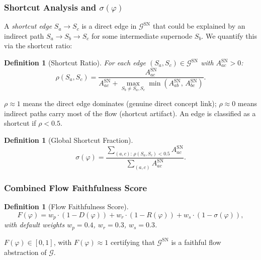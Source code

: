 \documentclass[11pt]{article}
\newtheorem{definition}[theorem]{Definition}
\newcommand{\cG}{\mathcal{G}}
\newcommand{\1}{\mathbbm{1}}
\begin{document}
\subsubsection{Shortcut Analysis and $\sigma(\varphi)$}
\label{sec:shortcuts}

A \emph{shortcut edge} $S_a \to S_c$ is a direct edge in $\cG^{\mathrm{SN}}$ that could be explained by an indirect path $S_a \to S_b \to S_c$ for some intermediate supernode $S_b$.
We quantify this via the shortcut ratio:

\begin{definition}[Shortcut Ratio]
  For each edge $(S_a, S_c) \in \cG^{\mathrm{SN}}$ with $A^{\mathrm{SN}}_{ac} > 0$:
  \begin{equation}
    \rho(S_a, S_c) = \frac{A^{\mathrm{SN}}_{ac}}{A^{\mathrm{SN}}_{ac} + \displaystyle\max_{S_b \ne S_a, S_c} \min\!\left(A^{\mathrm{SN}}_{ab},\, A^{\mathrm{SN}}_{bc}\right)}.
    \label{eq:shortcut-ratio}
  \end{equation}
\end{definition}

$\rho \approx 1$ means the direct edge dominates (genuine direct concept link); $\rho \approx 0$ means indirect paths carry most of the flow (shortcut artifact).
An edge is classified as a shortcut if $\rho < 0.5$.

\begin{definition}[Global Shortcut Fraction]
  \begin{equation}
    \sigma(\varphi) = \frac{\sum_{(a,c):\, \rho(S_a, S_c) < 0.5} A^{\mathrm{SN}}_{ac}}{\sum_{(a,c)} A^{\mathrm{SN}}_{ac}}.
    \label{eq:sigma-phi}
  \end{equation}
\end{definition}

\subsubsection{Combined Flow Faithfulness Score}
\label{sec:combined}

\begin{definition}[Flow Faithfulness Score]
  \begin{equation}
    F(\varphi) = w_p \cdot (1 - D(\varphi)) + w_r \cdot (1 - R(\varphi)) + w_s \cdot (1 - \sigma(\varphi)),
    \label{eq:F-phi}
  \end{equation}
  with default weights $w_p = 0.4$, $w_r = 0.3$, $w_s = 0.3$.
\end{definition}

$F(\varphi) \in [0,1]$, with $F(\varphi) \approx 1$ certifying that $\cG^{\mathrm{SN}}$ is a faithful flow abstraction of $\cG$.
\end{document}
